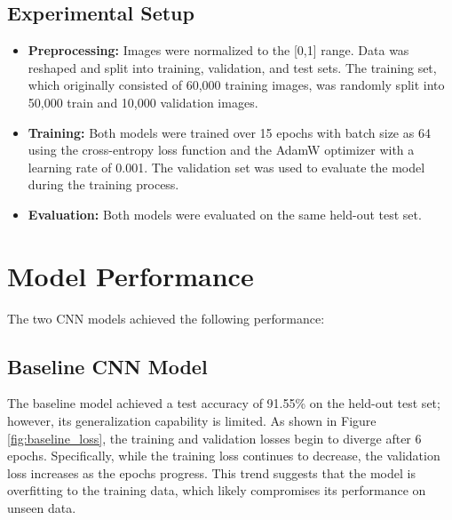 \documentclass[letterpaper]{article}
\begin{document}
	\subsection{Experimental Setup}
	\begin{itemize}
		\item \textbf{Preprocessing:} Images were normalized to the [0,1] range. Data was reshaped and split into training, validation, and test sets. The training set, which originally consisted of 60,000 training images, was randomly split into 50,000 train and 10,000 validation images.
		\item \textbf{Training:} Both models were trained over 15 epochs with batch size as 64 using the cross-entropy loss function and the AdamW optimizer with a learning rate of 0.001. The validation set was used to evaluate the model during the training process.
		\item \textbf{Evaluation:} Both models were evaluated on the same held-out test set.
	\end{itemize}
	
	\section{Model Performance}
	The two CNN models achieved the following performance:
	
	\subsection*{Baseline CNN Model}
	
	The baseline model achieved a test accuracy of 91.55\% on the held-out test set; however, its generalization capability is limited. As shown in Figure \ref{fig:baseline_loss}, the training and validation losses begin to diverge after 6 epochs. Specifically, while the training loss continues to decrease, the validation loss increases as the epochs progress. This trend suggests that the model is overfitting to the training data, which likely compromises its performance on unseen data.
	
\end{document}
